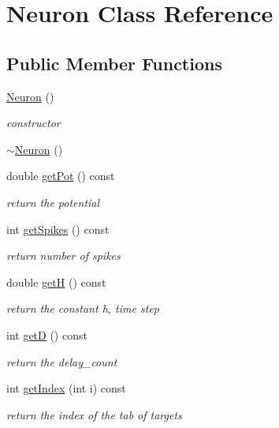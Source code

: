 \hypertarget{classNeuron}{\section{Neuron Class Reference}
\label{classNeuron}
}
\subsection*{Public Member Functions}
\begin{DoxyCompactItemize}
\item 
\hypertarget{classNeuron_a823487d01615fadb8ac19a2768dd9d96}{\hyperlink{classNeuron_a823487d01615fadb8ac19a2768dd9d96}{Neuron} ()}\label{classNeuron_a823487d01615fadb8ac19a2768dd9d96}

\begin{DoxyCompactList}\small\item\em constructor \end{DoxyCompactList}\item 
\hyperlink{classNeuron_a94a250ce7e167760e593979b899745b1}{$\sim$\-Neuron} ()
\item 
double \hyperlink{classNeuron_ad50bdc13371c54c2cb3ee1da8ec9b4b3}{get\-Pot} () const 
\begin{DoxyCompactList}\small\item\em return the potential \end{DoxyCompactList}\item 
int \hyperlink{classNeuron_ac1edb51fc4fec6c75fc0b136b870e162}{get\-Spikes} () const 
\begin{DoxyCompactList}\small\item\em return number of spikes \end{DoxyCompactList}\item 
double \hyperlink{classNeuron_a93d421cadcab22e36ea13dd0cc32310b}{get\-H} () const 
\begin{DoxyCompactList}\small\item\em return the constant h, time step \end{DoxyCompactList}\item 
int \hyperlink{classNeuron_a505f58b7ea857b257e6bdf41d6157bcb}{get\-D} () const 
\begin{DoxyCompactList}\small\item\em return the delay\-\_\-count \end{DoxyCompactList}\item 
int \hyperlink{classNeuron_a1d6e0e4830b0088d906befed97c738e0}{get\-Index} (int i) const 
\begin{DoxyCompactList}\small\item\em return the index of the tab of targets \end{DoxyCompactList}\item 

\end{DoxyCompactItemize}
